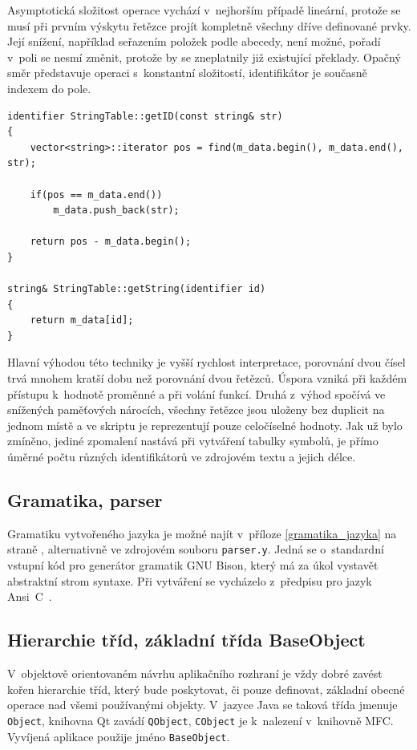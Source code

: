 \documentclass[11pt,twoside,a4paper]{book}
\begin{document}
Asymptotická složitost operace vychází v~nejhorším případě lineární, protože se musí při prvním výskytu řetězce projít kompletně všechny dříve definované prvky. Její snížení, na\-pří\-klad seřazením položek podle abecedy, není možné, pořadí v~poli se nesmí změnit, protože by se zneplatnily již existující překlady. Opačný směr představuje operaci s~konstantní složitostí, identifikátor je současně indexem do pole.

\begin{verbatim}
identifier StringTable::getID(const string& str)
{
    vector<string>::iterator pos = find(m_data.begin(), m_data.end(), str);

    if(pos == m_data.end())
        m_data.push_back(str);

    return pos - m_data.begin();
}

string& StringTable::getString(identifier id)
{
    return m_data[id];
}
\end{verbatim}

Hlavní výhodou této techniky je vyšší rychlost interpretace, porovnání dvou čísel trvá mnohem kratší dobu než porovnání dvou řetězců. Úspora vzniká při každém přístupu k~hodnotě proměnné a při volání funkcí. Druhá z~výhod spočívá ve snížených paměťových nárocích, všechny řetězce jsou uloženy bez duplicit na jednom místě a ve skriptu je reprezentují pouze celočíselné hodnoty. Jak už bylo zmíněno, jediné zpomalení nastává při vytváření tabulky symbolů, je přímo úměrné počtu různých identifikátorů ve zdrojovém textu a jejich délce.


\subsection{Gramatika, parser}

Gramatiku vytvořeného jazyka je možné najít v~příloze \ref{gramatika_jazyka} na straně \pageref{gramatika_jazyka}, alternativně ve zdrojovém souboru \texttt{parser.y}. Jedná se o~standardní vstupní kód pro generátor gramatik GNU Bison, který má za úkol vystavět abstraktní strom syntaxe. Při vytváření se vycházelo z~předpisu pro jazyk Ansi~C~\cite{c_grammar}.


\subsection{Hierarchie tříd, základní třída BaseObject}

V~objektově orientovaném návrhu aplikačního rozhraní je vždy dobré zavést kořen hierarchie tříd, který bude poskytovat, či pouze definovat, základní obecné operace nad všemi používanými objekty. V~jazyce Java se taková třída jmenuje \texttt{Object}, knihovna Qt zavádí \texttt{QObject}, \texttt{CObject} je k~nalezení v~knihovně MFC. Vyvíjená aplikace použije jméno \texttt{Ba\-se\-Ob\-ject}.
\end{document}
